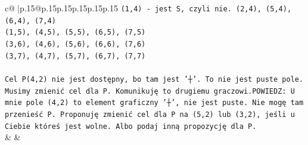 \documentclass{article}
\begin{document}
{\begin{supertabular}{c@{$\;$}|p{.15\linewidth}@{}p{.15\linewidth}p{.15\linewidth}p{.15\linewidth}p{.15\linewidth}p{.15\linewidth}}
{{{\texttt{(1,4) {-} jest S, czyli nie. (2,4), (5,4), (6,4), (7,4)} \\
\texttt{(1,5), (4,5), (5,5), (6,5), (7,5)} \\
\texttt{(3,6), (4,6), (5,6), (6,6), (7,6)} \\
\texttt{(3,7), (4,7), (5,7), (6,7), (7,7)} \\
\\ 
\texttt{Cel P(4,2) nie jest dostępny, bo tam jest '┼'. To nie jest puste pole. Musimy zmienić cel dla P. Komunikuję to drugiemu graczowi.POWIEDZ: U mnie pole (4,2) to element graficzny '┼', nie jest puste. Nie mogę tam przenieść P. Proponuję zmienić cel dla P na (5,2) lub (3,2), jeśli u Ciebie któreś jest wolne. Albo podaj inną propozycję dla P.} \\
            }
        }
    }
    & & \\ \\


\end{supertabular}}
\end{document}
